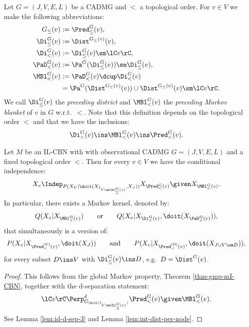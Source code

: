 \begin{Def}
    Let $G=(J,V,E,L)$ be a CADMG and $<$ a topological order.
    For $v \in  V$ we make the following abbreviations:
    \begin{align*}
        G_\le(v) &:= \Pred^G_\le(v), \\%
        \Di^G_\le(v) &:= \Dist^{G_\le(v)}(v),\\%
        \Di^G_<(v) &:= \Di^G_\le(v) \sm \lC v \rC, \\%
        \PaD^G_<(v) &:= \Pa^G(\Di^G_\le(v)) \sm \Di^G_\le(v), \\%
        \MBl^G_<(v) &:= \PaD^G_<(v) \dcup \Di^G_<(v) \\ %
                    &= \Pa^G(\Dist^{G_\le(v)}(v)) \cup \Dist^{G_\le(v)}(v) \sm \lC v \rC.
    \end{align*}
    We call $\Di^G_\le(v)$ the \emph{preceding district} and
    $\MBl^G_<(v)$ the  \emph{preceding Markov blanket} of $v$ in $G$ w.r.t.\ $<$.
    Note that this definition depends on the topological order $<$ and that we have the inclusions: 
    \[\Di^G_<(v) \ins  \MBl^G_<(v) \ins  \Pred_<^G(v).\] 
\end{Def}



\begin{Prp}
    \label{prp:ioLMP}
    Let $M$ be an IL-CBN with with observational CADMG $G=(J,V,E,L)$ and a fixed topological order $<$.
    Then for every $v \in V$ we have the conditional independence:
    \[ X_v \Indep_{P(X_V|\doit(X_{I_{V \sm \Di^G_\le(v)}},X_J))}  X_{\Pred^G_<(v)} \given X_{\MBl^G_<(v)}.\]
    In particular, 
    there exists a Markov kernel, denoted by: 
    \[Q(X_v|X_{\MBl^G_<(v)}) \qquad \text{or} \qquad Q(X_v|X_{\Di^G_<(v)},\doit(X_{\PaD^G_<(v)})), \] 
    that simultaneously is a version of:
    \[ P(X_v|X_{\Pred^{[V]}_<(v)},\doit(X_J)) \qquad \text{and} \qquad P(X_v|X_{\Pred^{[D]}_<(v)},\doit(X_{J \cup V\sm D})),\]
    for every subset $D \ins V$ with $\Di^G_\le(v) \ins D$, e.g.\ $D=\Dist^G(v)$.
    \begin{proof}
        This follows from the global Markov property, Theorem \ref{thm-gmp-mI-CBN}, together with the d-separation statement:
        \[ \lC v\rC \Perp^d_{ G_{\doit( I_{V \sm \Di^G_\le(v)} )}}  \Pred^G_<(v) \given \MBl^G_<(v).\]
        See Lemma \ref{lem:id-d-sep-3} and Lemma \ref{lem:int-dist-per-node}.
    \end{proof}
\end{Prp}

